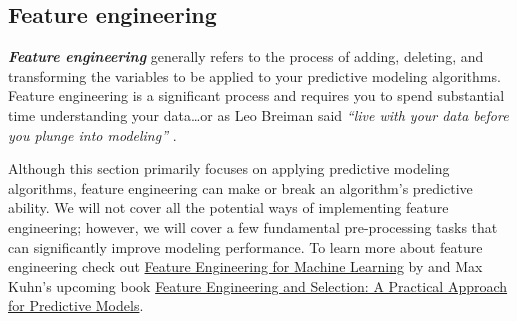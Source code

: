 \documentclass[]{book}
\newenvironment{Shaded}{\begin{snugshade}}{\end{snugshade}}
\newcommand{\CommentTok}[1]{\textcolor[rgb]{0.56,0.35,0.01}{\textit{#1}}}
\newcommand{\DataTypeTok}[1]{\textcolor[rgb]{0.13,0.29,0.53}{#1}}
\newcommand{\DecValTok}[1]{\textcolor[rgb]{0.00,0.00,0.81}{#1}}
\newcommand{\FloatTok}[1]{\textcolor[rgb]{0.00,0.00,0.81}{#1}}
\newcommand{\KeywordTok}[1]{\textcolor[rgb]{0.13,0.29,0.53}{\textbf{#1}}}
\newcommand{\NormalTok}[1]{#1}
\newcommand{\OperatorTok}[1]{\textcolor[rgb]{0.81,0.36,0.00}{\textbf{#1}}}
\newcommand{\StringTok}[1]{\textcolor[rgb]{0.31,0.60,0.02}{#1}}
\theoremstyle{definition}
\theoremstyle{definition}
\theoremstyle{definition}
\theoremstyle{remark}
\begin{document}
\begin{Shaded}
\end{Shaded}

\hypertarget{reg_perf_feat}{%
\subsection{Feature engineering}\label{reg_perf_feat}}

\textbf{\emph{Feature engineering}} generally refers to the process of
adding, deleting, and transforming the variables to be applied to your
predictive modeling algorithms. Feature engineering is a significant
process and requires you to spend substantial time understanding your
data\ldots{}or as Leo Breiman said \emph{``live with your data before
you plunge into modeling''} \citep{breiman2001statistical}.

Although this section primarily focuses on applying predictive modeling
algorithms, feature engineering can make or break an algorithm's
predictive ability. We will not cover all the potential ways of
implementing feature engineering; however, we will cover a few
fundamental pre-processing tasks that can significantly improve modeling
performance. To learn more about feature engineering check out
\href{http://shop.oreilly.com/product/0636920049081.do}{Feature
Engineering for Machine Learning} by \citet{zheng2018feature} and Max
Kuhn's upcoming book \href{http://www.feat.engineering/}{Feature
Engineering and Selection: A Practical Approach for Predictive Models}.
\end{document}
